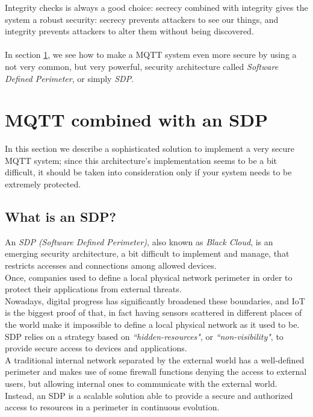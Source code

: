 \documentclass[12pt]{report}
\begin{document}
{{Integrity checks is always a good choice: secrecy combined with integrity gives the system a robust security: secrecy prevents attackers to see our things, and integrity prevents attackers to alter them without being discovered.\\\\
In section \ref{sec:mqttsdp}, we see how to make a MQTT system even more secure by using a not very common, but very powerful, security architecture called \emph{Software Defined Perimeter}, or simply \emph{SDP}.\\


\section{MQTT combined with an SDP}
\label{sec:mqttsdp}
\bigskip
In this section we describe a sophisticated solution to implement a very secure MQTT system; since this architecture's implementation seems to be a bit difficult, it should be taken into consideration only if your system needs to be extremely protected.\\

\subsection{What is an SDP?}
\bigskip
An \emph{SDP (Software Defined Perimeter)}, also known as \emph{Black Cloud}, is an emerging security architecture, a bit difficult to implement and manage, that restricts accesses and connections among allowed devices.\\
Once, companies used to define a local physical network perimeter in order to protect their applications from external threats.\\
Nowadays, digital progress has significantly broadened these boundaries, and IoT is the biggest proof of that, in fact having sensors scattered in different places of the world make it impossible to define a local physical network as it used to be.\\

SDP relies on a strategy based on \emph{``hidden-resources"}, or \emph{``non-visibility"}, to provide secure access to devices and applications.\\
A traditional internal network separated by the external world has a well-defined perimeter and makes use of some firewall functions denying the access to external users, but allowing internal ones to communicate with the external world.\\
Instead, an SDP is a scalable solution able to provide a secure and authorized access to resources in a perimeter in continuous evolution.\\

}}
\end{document}
